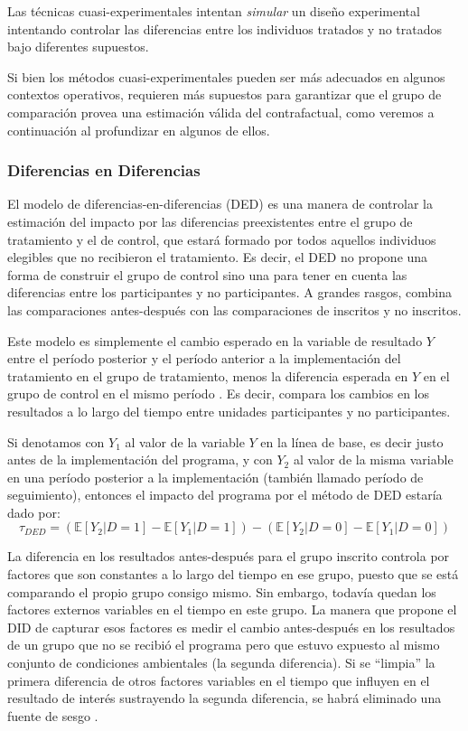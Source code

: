 \documentclass[../../main.tex]{subfiles}
\begin{document}
Las técnicas cuasi-experimentales intentan \textit{simular} un diseño experimental intentando controlar las diferencias entre los individuos tratados y no tratados bajo diferentes supuestos.

Si bien los métodos cuasi-experimentales pueden ser más adecuados en algunos contextos operativos, requieren más supuestos para garantizar que el grupo de comparación provea una estimación válida del contrafactual, como veremos a continuación al profundizar en algunos de ellos.

\subsubsection{Diferencias en Diferencias}
El modelo de diferencias-en-diferencias (DED) es una manera de controlar la estimación del impacto por las diferencias preexistentes entre el grupo de tratamiento y el de control, que estará formado por todos aquellos individuos elegibles que no recibieron el tratamiento. Es decir, el DED no propone una forma de construir el grupo de control sino una para tener en cuenta las diferencias entre los participantes y no participantes. A grandes rasgos, combina las comparaciones antes-después con las comparaciones de inscritos y no inscritos. 

Este modelo es simplemente el cambio esperado en la variable de resultado \(Y\) entre el período posterior y el período anterior a la implementación del tratamiento en el grupo de tratamiento, menos la diferencia esperada en \(Y\) en el grupo de control en el mismo período \cite{bernal}. Es decir, compara los cambios en los resultados a lo largo del tiempo entre unidades participantes y no participantes. 

Si denotamos con \(Y_1\) al valor de la variable \(Y\) en la línea de base, es decir justo antes de la implementación del programa, y con \(Y_2\) al valor de la misma variable en una período posterior a la implementación (también llamado período de seguimiento), entonces el impacto del programa por el método de DED estaría dado por:
\begin{equation}
    \tau_{DED} = 
        \left(
            \mathbb{E}\left[Y_2|D=1\right] - \mathbb{E}\left[Y_1|D=1\right]
        \right) -
        \left(
            \mathbb{E}\left[Y_2|D=0\right] - \mathbb{E}\left[Y_1|D=0\right]
        \right)
\end{equation}

La diferencia en los resultados antes-después para el grupo inscrito controla por factores que son constantes a lo largo del tiempo en ese grupo, puesto que se está comparando el propio grupo consigo mismo. Sin embargo, todavía quedan los factores externos variables en el tiempo en este grupo. La manera que propone el DID de capturar esos factores es medir el cambio antes-después en los resultados de un grupo que no se recibió el programa pero que estuvo expuesto al mismo conjunto de condiciones ambientales (la segunda diferencia). Si se ``limpia'' la primera diferencia de otros factores variables en el tiempo que influyen en el resultado de interés sustrayendo la segunda diferencia, se habrá eliminado una fuente de sesgo \cite{gertler-2016}.
\end{document}
